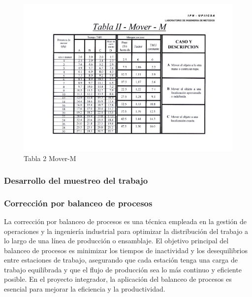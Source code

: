     \begin{figure}[H]
        \centering
        \includegraphics[scale=0.150]{21/img/tabla2MoverM.pdf}
        \caption{Tabla 2 Mover-M}
        \label{fig:tabla2MoverM}
    \end{figure}
    
    \subsubsection{Desarrollo del muestreo del trabajo}
    
    \subsubsection{Corrección por balanceo de procesos}
    La corrección por balanceo de procesos es una técnica empleada en la gestión de operaciones y la ingeniería industrial para optimizar la distribución del trabajo a lo largo de una línea de producción o ensamblaje. El objetivo principal del balanceo de procesos es minimizar los tiempos de inactividad y los desequilibrios entre estaciones de trabajo, asegurando que cada estación tenga una carga de trabajo equilibrada y que el flujo de producción sea lo más continuo y eficiente posible. En el proyecto integrador, la aplicación del balanceo de procesos es esencial para mejorar la eficiencia y la productividad.
